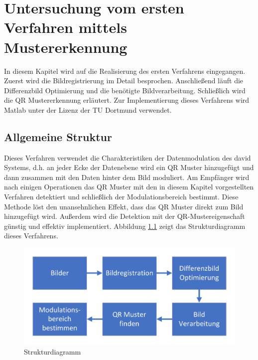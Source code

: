 \chapter{Untersuchung vom ersten Verfahren mittels Mustererkennung } 

In diesem Kapitel wird auf die Realisierung des ersten Verfahrens eingegangen. Zuerst wird die Bildregistrierung im Detail besprochen. Anschließend läuft die Differenzbild Optimierung und die benötigte Bildverarbeitung. Schließlich wird die QR Mustererkennung erläutert. Zur Implementierung dieses Verfahrens wird Matlab unter der Lizenz der TU Dortmund verwendet.

\section{Allgemeine Struktur} 

Dieses Verfahren verwendet die Charakteristiken der Datenmodulation des \gls{david} Systems, d.h. an jeder Ecke der Datenebene wird ein QR Muster hinzugefügt und dann zusammen mit den Daten hinter dem Bild moduliert. Am Empfänger wird nach einigen Operationen das QR Muster mit den in diesem Kapitel vorgestellten Verfahren detektiert und schließlich der Modulationsbereich bestimmt. Diese Methode löst den unansehnlichen Effekt, dass das QR Muster direkt zum Bild hinzugefügt wird. Außerdem wird die Detektion mit der QR-Mustereigenschaft günstig und effektiv implementiert. Abbildung \ref{fig:Strukturdiagramm} zeigt das Strukturdiagramm dieses Verfahrens.

\begin{figure}[H]
 \centering 
 \includegraphics[keepaspectratio,width=1.0\textwidth]{images/3_Ersteverfahren/Strukturdiagramm.pdf}
 \caption{Strukturdiagramm}
 \label{fig:Strukturdiagramm}
\end{figure}

